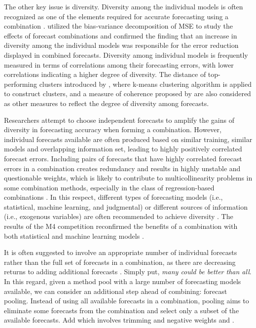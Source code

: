 \documentclass[11pt]{article}
\begin{document}
The other key issue is diversity. Diversity among the individual models is often recognized as one of the elements required for accurate forecasting using a combination \citep{Batchelor1995-ps,Brown2005-aa,Thomson2019-al}. \cite{Atiya2020-ge} utilized the bias-variance decomposition of MSE to study the effects of forecast combinations and confirmed the finding that an increase in diversity among the individual models was responsible for the error reduction displayed in combined forecasts. Diversity among individual models is frequently measured in terms of correlations among their forecasting errors, with lower correlations indicating a higher degree of diversity. The distance of top-performing clusters introduced by \cite{Lemke2010-wn}, where k-means clustering algorithm is applied to construct clusters, and a measure of coherence proposed by \cite{Thomson2019-al} are also considered as other measures to reflect the degree of diversity among forecasts.

Researchers attempt to choose independent forecasts to amplify the gains of diversity in forecasting accuracy when forming a combination. However, individual forecasts available are often produced based on similar training, similar models and overlapping information set, leading to highly positively correlated forecast errors. Including pairs of forecasts that have highly correlated forecast errors in a combination creates redundancy and results in highly unstable and questionable weights, which is likely to contribute to multicollinearity problems in some combination methods, especially in the class of regression-based combinations \citep{Granger1984-jc}. In this respect, different types of forecasting models (i.e., statistical, machine learning, and judgmental) or different sources of information (i.e., exogenous variables) are often recommended to achieve diversity \citep{Atiya2020-ge}. The results of the M4 competition reconfirmed the benefits of a combination with both statistical and machine learning models \citep{Makridakis2020-hu}.

It is often suggested to involve an appropriate number of individual forecasts rather than the full set of forecasts in a combination, as there are decreasing returns to adding additional forecasts \citep{Armstrong2001-sj,Zhou2002-cg,Geweke2011-xk,Lichtendahl2020-ut}. Simply put, \textit{many could be better than all}. In this regard, given a method pool with a large number of forecasting models available, we can consider an additional step ahead of combining: forecast pooling. Instead of using all available forecasts in a combination, pooling aims to eliminate some forecasts from the combination and select only a subset of the available forecasts. {\color{red} Add \cite{Radchenko2021-cw} which involves trimming and negative weights and \cite{Cang2014-tp}.}
\end{document}
